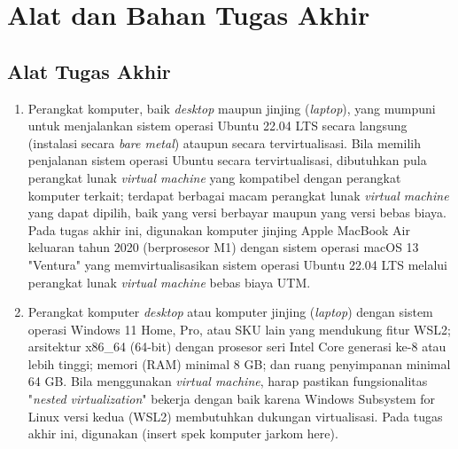 \section{Alat dan Bahan Tugas Akhir}

\subsection{Alat Tugas Akhir}

\begin{enumerate}
    \item Perangkat komputer, baik \textit{desktop} maupun jinjing (\textit{laptop}), yang mumpuni untuk menjalankan sistem operasi Ubuntu 22.04 LTS secara langsung (instalasi secara \textit{bare metal}) ataupun secara tervirtualisasi. Bila memilih penjalanan sistem operasi Ubuntu secara tervirtualisasi, dibutuhkan pula perangkat lunak \textit{virtual machine} yang kompatibel dengan perangkat komputer terkait; terdapat berbagai macam perangkat lunak \textit{virtual machine} yang dapat dipilih, baik yang versi berbayar maupun yang versi bebas biaya. Pada tugas akhir ini, digunakan komputer jinjing Apple MacBook Air keluaran tahun 2020 (berprosesor M1) dengan sistem operasi macOS 13 "Ventura" yang memvirtualisasikan sistem operasi Ubuntu 22.04 LTS melalui perangkat lunak \textit{virtual machine} bebas biaya UTM.
    \item Perangkat komputer \textit{desktop} atau komputer jinjing (\textit{laptop}) dengan sistem operasi Windows 11 Home, Pro, atau SKU lain yang mendukung fitur WSL2; arsitektur x86\_64 (64-bit) dengan prosesor seri Intel Core generasi ke-8 atau lebih tinggi; memori (RAM) minimal 8 GB; dan ruang penyimpanan minimal 64 GB. Bila menggunakan \textit{virtual machine}, harap pastikan fungsionalitas "\textit{nested virtualization}" bekerja dengan baik karena Windows Subsystem for Linux versi kedua (WSL2) membutuhkan dukungan virtualisasi. Pada tugas akhir ini, digunakan (insert spek komputer jarkom here).

\end{enumerate}
